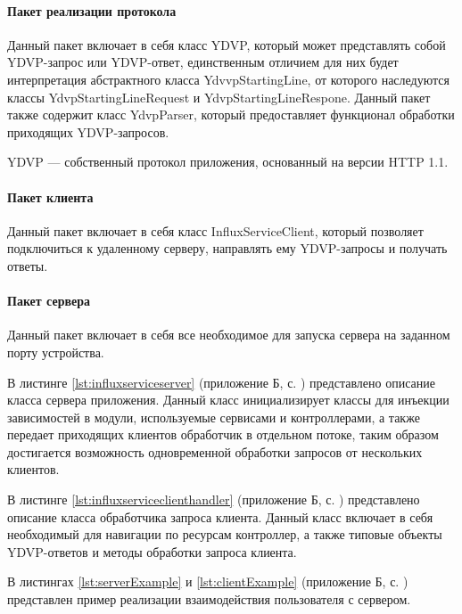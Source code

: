 \paragraph{Пакет реализации протокола \newline}
Данный пакет включает в себя класс YDVP, который может представлять собой YDVP-запрос или YDVP-ответ, единственным отличием для них будет интерпретация абстрактного класса YdvvpStartingLine, от которого наследуются классы YdvpStartingLineRequest и YdvpStartingLineRespone. Данный пакет также содержит класс YdvpParser, который предоставляет функционал обработки приходящих YDVP-запросов.

YDVP --- собственный протокол приложения, основанный на версии \newline HTTP 1.1.

\paragraph{Пакет клиента \newline}
Данный пакет включает в себя класс InfluxServiceClient, который позволяет подключиться к удаленному серверу, направлять ему YDVP-запросы и получать ответы.

\paragraph{Пакет сервера \newline}

Данный пакет включает в себя все необходимое для запуска сервера на заданном порту устройства.

В листинге \ref{lst:influxserviceserver} (приложение Б, с. \pageref{chp:application-b}) представлено описание класса сервера приложения. Данный класс инициализирует классы для инъекции зависимостей в модули, используемые сервисами и контроллерами, а также передает приходящих клиентов обработчик в отдельном потоке, таким образом достигается возможность одновременной обработки запросов от нескольких клиентов.

В листинге \ref{lst:influxserviceclienthandler} (приложение Б, с. \pageref{chp:application-b}) представлено описание класса обработчика запроса клиента. Данный класс включает в себя необходимый для навигации по ресурсам контроллер, а также типовые объекты YDVP-ответов и методы обработки запроса клиента.

В листингах \ref{lst:serverExample} и \ref{lst:clientExample} (приложение Б, с. \pageref{chp:application-b}) представлен пример реализации взаимодействия пользователя с сервером.


